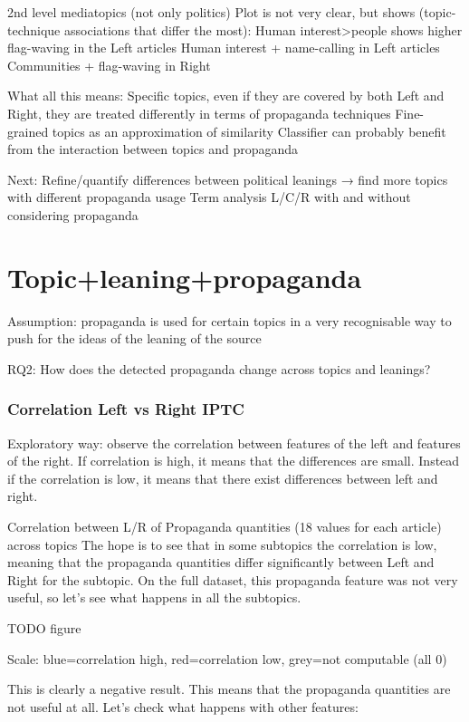 2nd level mediatopics (not only politics)
Plot is not very clear, but shows (topic-technique associations that differ the most):
Human interest>people shows higher flag-waving in the Left articles
Human interest + name-calling in Left articles
Communities + flag-waving in Right

What all this means:
Specific topics, even if they are covered by both Left and Right, they are treated differently in terms of propaganda techniques
Fine-grained topics as an approximation of similarity
Classifier can probably benefit from the interaction between topics and propaganda

Next:
Refine/quantify differences between political leanings → find more topics with different propaganda usage
Term analysis L/C/R with and without considering propaganda





\section{Topic+leaning+propaganda}
\label{sec:topic_propaganda_leaning}

Assumption: propaganda is used for certain topics in a very recognisable way to push for the ideas of the leaning of the source

RQ2: How does the detected propaganda change across topics and leanings? 

\subsubsection{Correlation Left vs Right IPTC}
Exploratory way: observe the correlation between features of the left and features of the right. If correlation is high, it means that the differences are small. Instead if the correlation is low, it means that there exist differences between left and right.


Correlation between L/R of Propaganda quantities (18 values for each article) across topics
The hope is to see that in some subtopics the correlation is low, meaning that the propaganda quantities differ significantly between Left and Right for the subtopic.
On the full dataset, this propaganda feature was not very useful, so let’s see what happens in all the subtopics.

TODO figure

Scale: blue=correlation high, red=correlation low, grey=not computable (all 0)

This is clearly a negative result. This means that the propaganda quantities are not useful at all. Let’s check what happens with other features:


